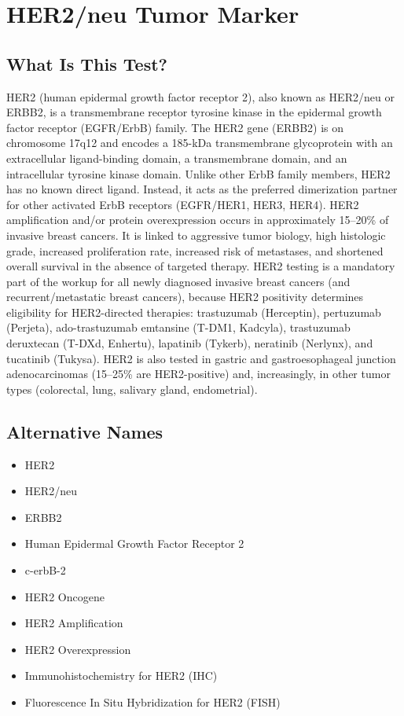 \chapter{HER2/neu Tumor Marker}

\section*{What Is This Test?}
HER2 (human epidermal growth factor receptor 2), also known as HER2/neu or ERBB2, is a transmembrane receptor tyrosine kinase in the epidermal growth factor receptor (EGFR/ErbB) family. The HER2 gene (ERBB2) is on chromosome 17q12 and encodes a 185-kDa transmembrane glycoprotein with an extracellular ligand-binding domain, a transmembrane domain, and an intracellular tyrosine kinase domain. Unlike other ErbB family members, HER2 has no known direct ligand. Instead, it acts as the preferred dimerization partner for other activated ErbB receptors (EGFR/HER1, HER3, HER4). HER2 amplification and/or protein overexpression occurs in approximately 15--20\% of invasive breast cancers. It is linked to aggressive tumor biology, high histologic grade, increased proliferation rate, increased risk of metastases, and shortened overall survival in the absence of targeted therapy. HER2 testing is a mandatory part of the workup for all newly diagnosed invasive breast cancers (and recurrent/metastatic breast cancers), because HER2 positivity determines eligibility for HER2-directed therapies: trastuzumab (Herceptin), pertuzumab (Perjeta), ado-trastuzumab emtansine (T-DM1, Kadcyla), trastuzumab deruxtecan (T-DXd, Enhertu), lapatinib (Tykerb), neratinib (Nerlynx), and tucatinib (Tukysa). HER2 is also tested in gastric and gastroesophageal junction adenocarcinomas (15--25\% are HER2-positive) and, increasingly, in other tumor types (colorectal, lung, salivary gland, endometrial).

\section*{Alternative Names}
\begin{itemize}
  \item HER2
  \item HER2/neu
  \item ERBB2
  \item Human Epidermal Growth Factor Receptor 2
  \item c-erbB-2
  \item HER2 Oncogene
  \item HER2 Amplification
  \item HER2 Overexpression
  \item Immunohistochemistry for HER2 (IHC)
  \item Fluorescence In Situ Hybridization for HER2 (FISH)
\end{itemize}
